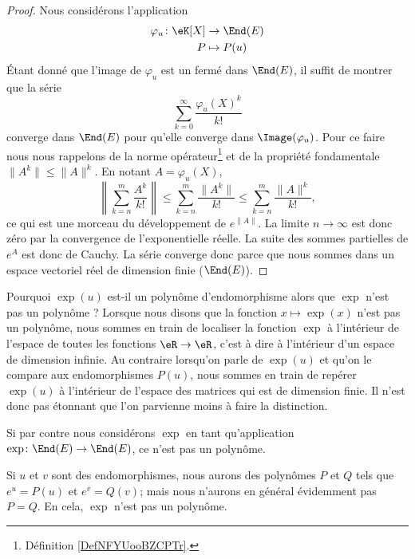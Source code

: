 \begin{proof}
    Nous considérons l'application
    \begin{equation}
        \begin{aligned}
            \varphi_u\colon \eK[X]&\to \End(E) \\
            P&\mapsto P(u)
        \end{aligned}
    \end{equation}
    Étant donné que l'image de \( \varphi_u\) est un fermé dans \( \End(E)\), il suffit de montrer que la série
    \begin{equation}
        \sum_{k=0}^{\infty}\frac{ \varphi_u(X)^k }{ k! }
    \end{equation}
    converge dans \( \End(E)\) pour qu'elle converge dans \( \Image(\varphi_u)\). Pour ce faire nous nous rappelons de la norme opérateur\footnote{Définition \ref{DefNFYUooBZCPTr}.} et de la propriété fondamentale \( \| A^k \|\leq \| A \|^k\). En notant \( A=\varphi_u(X)\),
    \begin{equation}
        \left\| \sum_{k=n}^m\frac{ A^k }{ k! } \right\|\leq \sum_{k=n}^m\frac{ \| A^k \| }{ k! }\leq \sum_{k=n}^m\frac{ \| A \|^k }{ k! },
    \end{equation}
    ce qui est une morceau du développement de \(  e^{\| A \|}\). La limite \( n\to\infty\) est donc zéro par la convergence de l'exponentielle réelle. La suite des sommes partielles de  $e^{A}$ est donc de Cauchy. La série converge donc parce que nous sommes dans un espace vectoriel réel de dimension finie (\( \End(E)\)).
\end{proof}

\begin{remark}
    Pourquoi \( \exp(u)\) est-il un polynôme d'endomorphisme alors que \( \exp\) n'est pas un polynôme ? Lorsque nous disons que la fonction \( x\mapsto \exp(x)\) n'est pas un polynôme, nous sommes en train de localiser la fonction \( \exp\) à l'intérieur de l'espace de toutes les fonctions \( \eR\to \eR\), c'est à dire à l'intérieur d'un espace de dimension infinie. Au contraire lorsqu'on parle de \( \exp(u)\) et qu'on le compare aux endomorphismes \( P(u)\), nous sommes en train de repérer \( \exp(u)\) à l'intérieur de l'espace des matrices qui est de dimension finie. Il n'est donc pas étonnant que l'on parvienne moins à faire la distinction.

    Si par contre nous considérons \( \exp\) en tant qu'application \( \exp\colon \End(E)\to \End(E)\), ce n'est pas un polynôme.

    Si \( u\) et \( v\) sont des endomorphismes, nous aurons des polynômes \( P\) et \( Q\) tels que \( e^u=P(u)\) et \( e^v=Q(v)\); mais nous n'aurons en général évidemment pas \( P=Q\). En cela, \( \exp\) n'est pas un polynôme.
\end{remark}

